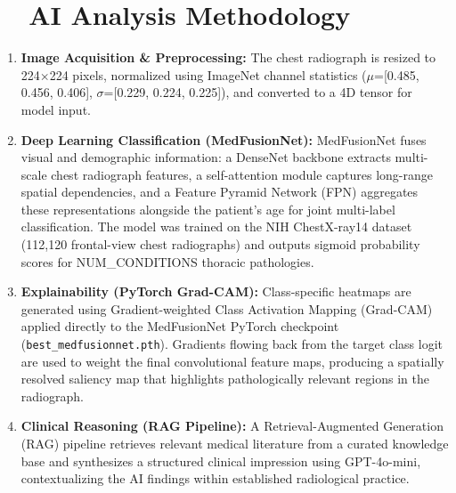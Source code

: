 \documentclass[11pt, a4paper]{article}
\begin{document}
\vspace{0.6em}

\section*{\faCogs\ \ AI Analysis Methodology}

\begin{methodbox}
\begin{enumerate}[leftmargin=1.5em, itemsep=4pt, label=\textbf{\arabic*.}]
  \item \textbf{Image Acquisition \& Preprocessing:}
    The chest radiograph is resized to 224$\times$224 pixels, normalized using ImageNet channel statistics
    ($\mu$=[0.485, 0.456, 0.406], $\sigma$=[0.229, 0.224, 0.225]), and converted to a 4D tensor for model input.

  \item \textbf{Deep Learning Classification (MedFusionNet):}
    MedFusionNet fuses visual and demographic information: a DenseNet backbone extracts multi-scale
    chest radiograph features, a self-attention module captures long-range spatial dependencies,
    and a Feature Pyramid Network (FPN) aggregates these representations alongside the patient's
    age for joint multi-label classification.
    The model was trained on the NIH ChestX-ray14 dataset (112,120 frontal-view chest radiographs)
    and outputs sigmoid probability scores for {{NUM_CONDITIONS}} thoracic pathologies.

  \item \textbf{Explainability (PyTorch Grad-CAM):}
    Class-specific heatmaps are generated using Gradient-weighted Class Activation Mapping (Grad-CAM)
    applied directly to the MedFusionNet PyTorch checkpoint (\texttt{best\_medfusionnet.pth}).
    Gradients flowing back from the target class logit are used to weight the final convolutional
    feature maps, producing a spatially resolved saliency map that highlights pathologically
    relevant regions in the radiograph.

  \item \textbf{Clinical Reasoning (RAG Pipeline):}
    A Retrieval-Augmented Generation (RAG) pipeline retrieves relevant medical literature from a curated
    knowledge base and synthesizes a structured clinical impression using GPT-4o-mini,
    contextualizing the AI findings within established radiological practice.
\end{enumerate}
\end{methodbox}
\end{document}

